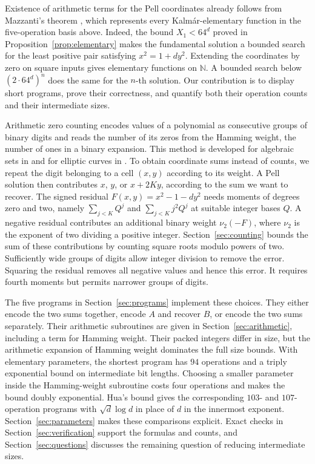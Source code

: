 \documentclass[11pt]{article}
\theoremstyle{remark}
\newcommand{\N}{\mathbb N}
\begin{document}
Existence of arithmetic terms for the Pell coordinates already follows
from Mazzanti's theorem \cite{Mazzanti}, which represents every
Kalm\'ar-elementary function in the five-operation basis above.
Indeed, the bound $X_1<64^d$ proved in
Proposition~\ref{prop:elementary} makes the fundamental solution a bounded
search for the least positive pair satisfying $x^2=1+dy^2$.
Extending the coordinates by zero on square inputs gives elementary
functions on $\N$. A bounded search below $(2\cdot64^d)^n$ does the same
for the $n$-th solution. Our contribution is to display short programs,
prove their correctness, and quantify both their operation counts and
their intermediate sizes.

Arithmetic zero counting encodes values of a polynomial as consecutive
groups of binary digits and reads the number of its zeros from the
Hamming weight, the number of ones in a binary expansion. This method is
developed for algebraic sets in \cite{Pru26} and for elliptic curves in
\cite{DP26}. To obtain coordinate sums instead of counts, we repeat the
digit belonging to a cell $(x,y)$ according to its weight. A Pell solution
then contributes $x$, $y$, or $x+2Ky$, according to the sum we want to
recover. The signed residual $F(x,y)=x^2-1-dy^2$ needs moments of degrees
zero and two, namely $\sum_{j<K}Q^j$ and $\sum_{j<K}j^2Q^j$ at suitable
integer bases $Q$. A negative residual contributes an additional binary
weight $\nu_2(-F)$, where $\nu_2$ is the exponent of two dividing a
positive integer. Section~\ref{sec:counting} bounds the sum of these
contributions by counting square roots modulo powers of two. Sufficiently
wide groups of digits allow integer division to remove the error.
Squaring the residual removes all negative values and hence this error.
It requires fourth moments but permits narrower groups of digits.

The five programs in Section~\ref{sec:programs} implement these choices.
They either encode the two sums together, encode $A$ and recover $B$, or
encode the two sums separately. Their arithmetic subroutines are given
in Section~\ref{sec:arithmetic}, including a term for Hamming weight.
Their packed integers differ in size, but the arithmetic expansion of
Hamming weight dominates the full size bounds. With elementary parameters,
the shortest program has $94$ operations and a triply exponential bound
on intermediate bit lengths. Choosing a smaller parameter inside the
Hamming-weight subroutine costs four operations and makes the bound doubly
exponential. Hua's bound \cite{Hua42,Len02} gives the corresponding
$103$- and $107$-operation programs with $\sqrt d\log d$ in place of $d$
in the innermost exponent. Section~\ref{sec:parameters} makes these
comparisons explicit. Exact checks in Section~\ref{sec:verification}
support the formulas and counts, and Section~\ref{sec:questions} discusses
the remaining question of reducing intermediate sizes.
\end{document}
